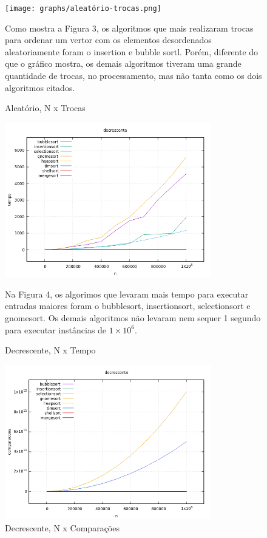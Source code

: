 \documentclass[report]{uftex}
\begin{document}
\begin{figure}[h]
\centering
\caption{Aleatório, N x Trocas}
\texttt{[image: graphs/aleatório-trocas.png]}

Como mostra a Figura 3, os algoritmos que mais realizaram trocas para ordenar um vertor com os elementos desordenados aleatoriamente foram o insertion e bubble sortl. Porém, diferente do que o gráfico mostra, os demais algoritmos tiveram uma grande quantidade de trocas, no processamento, mas não tanta como os dois algoritmos citados.
\end{figure}


\begin{figure}[h]
\centering
\caption{Decrescente, N x Tempo}
\includegraphics[width=0.8\textwidth]{graphs/decrescente-tempo.png}

Na Figura 4, os algorimos que levaram mais tempo para executar entradas maiores foram o bubblesort, insertionsort, selectionsort e gnomesort. Os demais algoritmos não levaram nem sequer 1 segundo para executar instâncias de $1\times10^6$.

\end{figure}

\begin{figure}[h]
\centering
\caption{Decrescente, N x Comparações}
\includegraphics[width=0.8\textwidth]{graphs/decrescente-comparações.png}
\end{figure}
\end{document}
